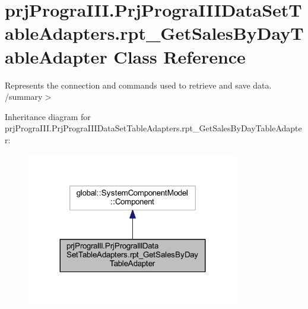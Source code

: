 \hypertarget{classprj_progra_i_i_i_1_1_prj_progra_i_i_i_data_set_table_adapters_1_1rpt___get_sales_by_day_table_adapter}{}\section{prj\+Progra\+I\+I\+I.\+Prj\+Progra\+I\+I\+I\+Data\+Set\+Table\+Adapters.\+rpt\+\_\+\+Get\+Sales\+By\+Day\+Table\+Adapter Class Reference}
\label{classprj_progra_i_i_i_1_1_prj_progra_i_i_i_data_set_table_adapters_1_1rpt___get_sales_by_day_table_adapter}


Represents the connection and commands used to retrieve and save data. /summary$>$  




Inheritance diagram for prj\+Progra\+I\+I\+I.\+Prj\+Progra\+I\+I\+I\+Data\+Set\+Table\+Adapters.\+rpt\+\_\+\+Get\+Sales\+By\+Day\+Table\+Adapter\+:
\nopagebreak
\begin{figure}[H]
\begin{center}
\leavevmode
\includegraphics[width=263pt]{classprj_progra_i_i_i_1_1_prj_progra_i_i_i_data_set_table_adapters_1_1rpt___get_sales_by_day_table_adapter__inherit__graph}
\end{center}
\end{figure}


